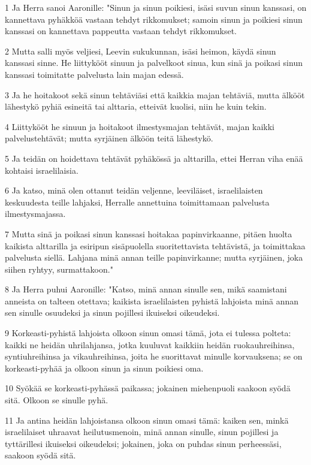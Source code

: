 \par 1 Ja Herra sanoi Aaronille: "Sinun ja sinun poikiesi, isäsi suvun sinun kanssasi, on kannettava pyhäkköä vastaan tehdyt rikkomukset; samoin sinun ja poikiesi sinun kanssasi on kannettava pappeutta vastaan tehdyt rikkomukset.
\par 2 Mutta salli myös veljiesi, Leevin sukukunnan, isäsi heimon, käydä sinun kanssasi sinne. He liittykööt sinuun ja palvelkoot sinua, kun sinä ja poikasi sinun kanssasi toimitatte palvelusta lain majan edessä.
\par 3 Ja he hoitakoot sekä sinun tehtäviäsi että kaikkia majan tehtäviä, mutta älkööt lähestykö pyhiä esineitä tai alttaria, etteivät kuolisi, niin he kuin tekin.
\par 4 Liittykööt he sinuun ja hoitakoot ilmestysmajan tehtävät, majan kaikki palvelustehtävät; mutta syrjäinen älköön teitä lähestykö.
\par 5 Ja teidän on hoidettava tehtävät pyhäkössä ja alttarilla, ettei Herran viha enää kohtaisi israelilaisia.
\par 6 Ja katso, minä olen ottanut teidän veljenne, leeviläiset, israelilaisten keskuudesta teille lahjaksi, Herralle annettuina toimittamaan palvelusta ilmestysmajassa.
\par 7 Mutta sinä ja poikasi sinun kanssasi hoitakaa papinvirkaanne, pitäen huolta kaikista alttarilla ja esiripun sisäpuolella suoritettavista tehtävistä, ja toimittakaa palvelusta siellä. Lahjana minä annan teille papinvirkanne; mutta syrjäinen, joka siihen ryhtyy, surmattakoon."
\par 8 Ja Herra puhui Aaronille: "Katso, minä annan sinulle sen, mikä saamistani anneista on talteen otettava; kaikista israelilaisten pyhistä lahjoista minä annan sen sinulle osuudeksi ja sinun pojillesi ikuiseksi oikeudeksi.
\par 9 Korkeasti-pyhistä lahjoista olkoon sinun omasi tämä, jota ei tulessa polteta: kaikki ne heidän uhrilahjansa, jotka kuuluvat kaikkiin heidän ruokauhreihinsa, syntiuhreihinsa ja vikauhreihinsa, joita he suorittavat minulle korvauksena; se on korkeasti-pyhää ja olkoon sinun ja sinun poikiesi oma.
\par 10 Syökää se korkeasti-pyhässä paikassa; jokainen miehenpuoli saakoon syödä sitä. Olkoon se sinulle pyhä.
\par 11 Ja antina heidän lahjoistansa olkoon sinun omasi tämä: kaiken sen, minkä israelilaiset uhraavat heilutusmenoin, minä annan sinulle, sinun pojillesi ja tyttärillesi ikuiseksi oikeudeksi; jokainen, joka on puhdas sinun perheessäsi, saakoon syödä sitä.
